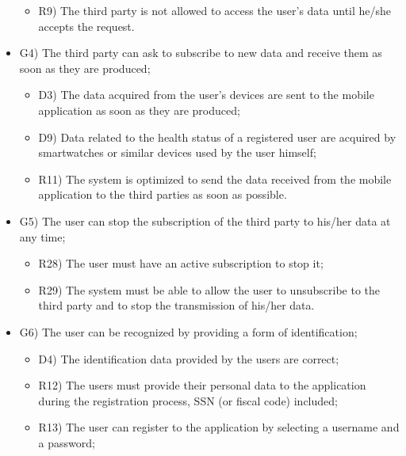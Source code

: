 \documentclass{article}
\begin{document}
\begin{legal}
\begin{legal}
\begin{legal}
\begin{itemize}
{\begin{itemize}
					\item R9) The third party is not allowed to access the user’s data until he/she accepts the request.\\
					\end{itemize}
				}
				\item G4) The third party can ask to subscribe to new data and receive them as soon as they are produced;\\
				{\normalfont
					\begin{itemize}
					\item D3) The data acquired from the user’s devices are sent to the mobile application as soon as they are produced;\\
	 				\item D9) Data related to the health status of a registered user are acquired by smartwatches or similar devices used by the user himself;\\
					\item R11) The system is optimized to send the data received from the mobile application to the third parties as soon as possible.\\
					\end{itemize}
				}
				\item G5) The user can stop the subscription of the third party to his/her data at any time;\\
				{\normalfont
					\begin{itemize}
					\item R28) The user must have an active subscription to stop it;\\
	 				\item R29) The system must be able to allow the user to unsubscribe to the third party and to stop the transmission of his/her data.\\
					\end{itemize}
				}
				\item G6) The user can be recognized by providing a form of identification;\\
				{\normalfont
					\begin{itemize}
					\item D4) The identification data provided by the users are correct;\\
	 				\item R12) The users must provide their personal data to the application during the registration process, SSN (or fiscal code) included;\\
					\item R13) The user can register to the application by selecting a username and a password;\\

\end{itemize}}
\end{itemize}
\end{legal}
\end{legal}
\end{legal}
\end{document}

